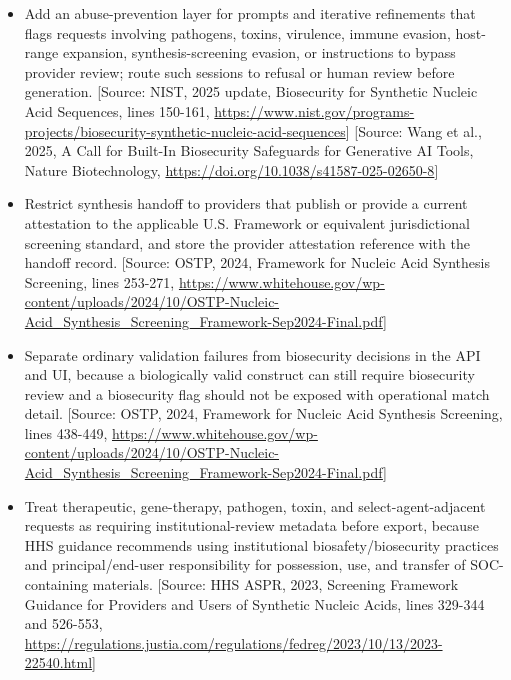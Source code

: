 \documentclass[11pt]{report}
\begin{document}
\begin{itemize}
\item Add an abuse-prevention layer for prompts and iterative refinements that flags requests involving pathogens, toxins, virulence, immune evasion, host-range expansion, synthesis-screening evasion, or instructions to bypass provider review; route such sessions to refusal or human review before generation. [Source: NIST, 2025 update, Biosecurity for Synthetic Nucleic Acid Sequences, lines 150-161, \url{https://www.nist.gov/programs-projects/biosecurity-synthetic-nucleic-acid-sequences}] [Source: Wang et al., 2025, A Call for Built-In Biosecurity Safeguards for Generative AI Tools, Nature Biotechnology, \url{https://doi.org/10.1038/s41587-025-02650-8}]
\item Restrict synthesis handoff to providers that publish or provide a current attestation to the applicable U.S. Framework or equivalent jurisdictional screening standard, and store the provider attestation reference with the handoff record. [Source: OSTP, 2024, Framework for Nucleic Acid Synthesis Screening, lines 253-271, \url{https://www.whitehouse.gov/wp-content/uploads/2024/10/OSTP-Nucleic-Acid_Synthesis_Screening_Framework-Sep2024-Final.pdf}]
\item Separate ordinary validation failures from biosecurity decisions in the API and UI, because a biologically valid construct can still require biosecurity review and a biosecurity flag should not be exposed with operational match detail. [Source: OSTP, 2024, Framework for Nucleic Acid Synthesis Screening, lines 438-449, \url{https://www.whitehouse.gov/wp-content/uploads/2024/10/OSTP-Nucleic-Acid_Synthesis_Screening_Framework-Sep2024-Final.pdf}]
\item Treat therapeutic, gene-therapy, pathogen, toxin, and select-agent-adjacent requests as requiring institutional-review metadata before export, because HHS guidance recommends using institutional biosafety/biosecurity practices and principal/end-user responsibility for possession, use, and transfer of SOC-containing materials. [Source: HHS ASPR, 2023, Screening Framework Guidance for Providers and Users of Synthetic Nucleic Acids, lines 329-344 and 526-553, \url{https://regulations.justia.com/regulations/fedreg/2023/10/13/2023-22540.html}]
\end{itemize}
\end{document}
